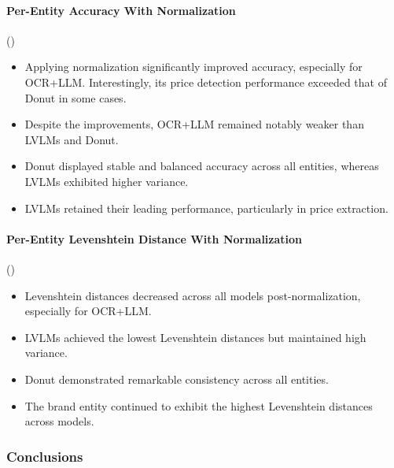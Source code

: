 \documentclass[11pt]{article}
\begin{document}
\paragraph{Per-Entity Accuracy With Normalization} ()
\begin{itemize}
    \item Applying normalization significantly improved accuracy, especially for OCR+LLM. Interestingly, its price detection performance exceeded that of Donut in some cases.
    \item Despite the improvements, OCR+LLM remained notably weaker than LVLMs and Donut.
    \item Donut displayed stable and balanced accuracy across all entities, whereas LVLMs exhibited higher variance.
    \item LVLMs retained their leading performance, particularly in price extraction.
\end{itemize}

\paragraph{Per-Entity Levenshtein Distance With Normalization} ()
\begin{itemize}
    \item Levenshtein distances decreased across all models post-normalization, especially for OCR+LLM.
    \item LVLMs achieved the lowest Levenshtein distances but maintained high variance.
    \item Donut demonstrated remarkable consistency across all entities.
    \item The brand entity continued to exhibit the highest Levenshtein distances across models.
\end{itemize}

\subsubsection{Conclusions}
\end{document}
